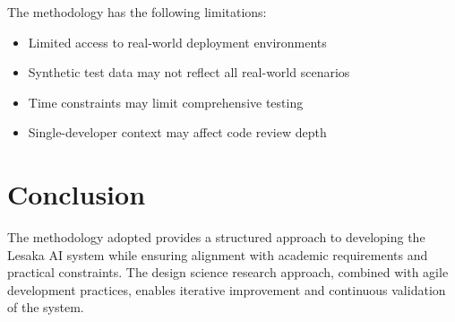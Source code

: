 The methodology has the following limitations:

\begin{itemize}
    \item Limited access to real-world deployment environments
    \item Synthetic test data may not reflect all real-world scenarios
    \item Time constraints may limit comprehensive testing
    \item Single-developer context may affect code review depth
\end{itemize}

\section{Conclusion}

The methodology adopted provides a structured approach to developing the Lesaka AI system while ensuring alignment with academic requirements and practical constraints. The design science research approach, combined with agile development practices, enables iterative improvement and continuous validation of the system.
